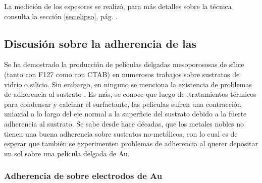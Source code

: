 		La medición de los espesores se realizó, para más detalles sobre la técnica consulta la sección \ref{sec:elipso}, pág. \pageref{sec:elipso}.
		
	\subsection{Discusión sobre la adherencia de las \pdm}	

		 Se ha demostrado la producción de películas delgadas mesoporososas de sílice (tanto con F127 como con CTAB) en numerosos trabajos sobre sustratos de vidrio o silicio. Sin embargo, en ninguno se menciona la existencia de problemas de adherencia al sustrato \cite{Angelome2008,Fuertes2010,Violi2015}. Es más, se conoce que luego de ,tratamientos térmicos para condensar y calcinar el surfactante, las películas sufren una contracción uniaxial a lo largo del eje normal a la superficie del sustrato debido a la fuerte adherencia al sustrato.\cite{Grosso2004,Soler-Illia2012,Chougnet2005} Se sabe desde hace décadas, que los metales nobles no tienen una buena adherencia sobre sustratos no-metálicos\cite{Kern1990,Hieber1976}, con lo cual es de esperar que también se experimenten problemas de adherencia al querer depositar un sol sobre una película delgada de Au. 

		\subsubsection{Adherencia de \pdm\space sobre electrodos de Au}

